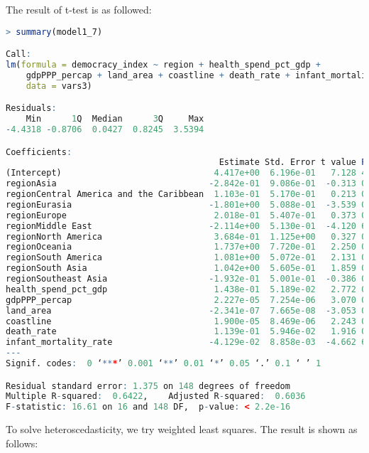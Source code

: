 The result of t-test is as followed:
\begin{lstlisting}[language=R, caption=Result of the model]
> summary(model1_7)

Call:
lm(formula = democracy_index ~ region + health_spend_pct_gdp + 
    gdpPPP_percap + land_area + coastline + death_rate + infant_mortality_rate, 
    data = vars3)

Residuals:
    Min      1Q  Median      3Q     Max 
-4.4318 -0.8706  0.0427  0.8245  3.5394 

Coefficients:
                                          Estimate Std. Error t value Pr(>|t|)    
(Intercept)                              4.417e+00  6.196e-01   7.128 4.16e-11 ***
regionAsia                              -2.842e-01  9.086e-01  -0.313 0.754878    
regionCentral America and the Caribbean  1.103e-01  5.170e-01   0.213 0.831330    
regionEurasia                           -1.801e+00  5.088e-01  -3.539 0.000537 ***
regionEurope                             2.018e-01  5.407e-01   0.373 0.709457    
regionMiddle East                       -2.114e+00  5.130e-01  -4.120 6.29e-05 ***
regionNorth America                      3.684e-01  1.125e+00   0.327 0.743755    
regionOceania                            1.737e+00  7.720e-01   2.250 0.025932 *  
regionSouth America                      1.081e+00  5.072e-01   2.131 0.034749 *  
regionSouth Asia                         1.042e+00  5.605e-01   1.859 0.065011 .  
regionSoutheast Asia                    -1.932e-01  5.001e-01  -0.386 0.699852    
health_spend_pct_gdp                     1.438e-01  5.189e-02   2.772 0.006284 ** 
gdpPPP_percap                            2.227e-05  7.254e-06   3.070 0.002545 ** 
land_area                               -2.341e-07  7.665e-08  -3.053 0.002683 ** 
coastline                                1.900e-05  8.469e-06   2.243 0.026369 *  
death_rate                               1.139e-01  5.946e-02   1.916 0.057354 .  
infant_mortality_rate                   -4.129e-02  8.858e-03  -4.662 6.94e-06 ***
---
Signif. codes:  0 ‘***’ 0.001 ‘**’ 0.01 ‘*’ 0.05 ‘.’ 0.1 ‘ ’ 1

Residual standard error: 1.375 on 148 degrees of freedom
Multiple R-squared:  0.6422,	Adjusted R-squared:  0.6036 
F-statistic: 16.61 on 16 and 148 DF,  p-value: < 2.2e-16
\end{lstlisting}

To solve heteroscedasticity, we try weighted least squares. The result is shown as follows:

